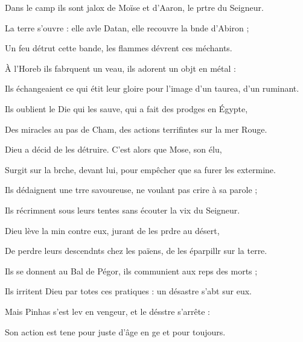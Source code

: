 \item Dans le camp ils sont jalox de Moïse\psstar{} et d’Aaron, le prtre du Seigneur.
\item La terre s’ouvre : elle avle Datan,\psstar{} elle recouvre la bnde d’Abiron ;
\item Un feu détrut cette bande,\psstar{} les flammes dévrent ces méchants.
\item À l’Horeb ils fabrquent un veau,\psstar{} ils adorent un objt en métal :
\item Ils échangeaient ce qui étit leur gloire\psstar{} pour l’image d’un taurea, d’un ruminant.
\item Ils oublient le Die qui les sauve,\psstar{} qui a fait des prodges en Égypte,
\item Des miracles au pas de Cham,\psstar{} des actions terrifintes sur la mer Rouge.
\item Dieu a décid de les détruire.\psstar{} C’est alors que Mose, son élu, 
\item Surgit sur la brche, devant lui,\psstar{} pour empêcher que sa furer les extermine.
\item Ils dédaignent une trre savoureuse,\psstar{} ne voulant pas crire à sa parole ;
\item Ils récrimnent sous leurs tentes\psstar{} sans écouter la vix du Seigneur.
\item Dieu lève la min contre eux,\psstar{} jurant de les prdre au désert,
\item De perdre leurs descendnts chez les païens,\psstar{} de les éparpillr sur la terre.
\item Ils se donnent au Bal de Pégor,\psstar{} ils communient aux reps des morts ;
\item Ils irritent Dieu par totes ces pratiques :\psstar{} un désastre s’abt sur eux.
\item Mais Pinhas s’est lev en vengeur,\psstar{} et le désstre s’arrête :
\item Son action est tene pour juste\psstar{} d’âge en ge et pour toujours.